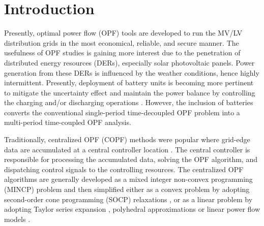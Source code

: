 \documentclass{article}
\begin{document}
\section{Introduction}

Presently, optimal power flow (OPF) tools are developed to run the MV/LV distribution grids in the most economical, reliable, and secure manner. The usefulness of OPF studies is gaining more interest due to the penetration of distributed energy resources (DERs), especially solar photovoltaic panels. Power generation from these DERs is influenced by the weather conditions, hence highly intermittent. Presently, deployment of battery units is becoming more pertinent to mitigate the uncertainty effect and maintain the power balance by controlling the charging and/or discharging operations \cite{tgangwar}. However, the inclusion of batteries converts the conventional single-period time-decoupled OPF problem into a multi-period time-coupled OPF analysis.

Traditionally, centralized OPF (COPF) methods were popular where grid-edge data are accumulated at a central controller location \cite{spaul}. The central controller is responsible for processing the accumulated data, solving the OPF algorithm, and dispatching control signals to the controlling resources. The centralized OPF algorithms are generally developed as a mixed integer non-convex programming (MINCP) problem and then simplified either as a convex problem by adopting second-order cone programming (SOCP) relaxations \cite{Wei} \cite{Chowdhury}, or as a linear problem by adopting Taylor series expansion \cite{spaul}, polyhedral approximations \cite{Guo} or linear power flow models \cite{Yuan}.

\end{document}
